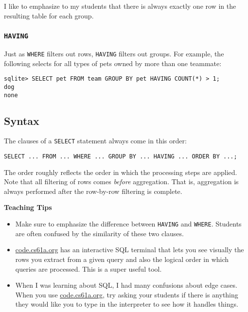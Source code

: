 \begin{meta}
I like to emphasize to my students that there is always exactly one row in the resulting table for each group. 
\end{meta}

\subsubsection{\lstinline{HAVING}}
Just as \lstinline{WHERE} filters out rows, \lstinline{HAVING} filters out groups. For example, the following selects for all types of pets owned by more than one teammate: 
\begin{lstlisting}
sqlite> SELECT pet FROM team GROUP BY pet HAVING COUNT(*) > 1; 
dog
none
\end{lstlisting}

\subsection{Syntax}
The clauses of a \lstinline{SELECT} statement always come in this order: 
\begin{lstlisting}
SELECT ... FROM ... WHERE ... GROUP BY ... HAVING ... ORDER BY ...;
\end{lstlisting}
The order roughly reflects the order in which the processing steps are applied. Note that all filtering of rows comes \textit{before} aggregation. That is, aggregation is always performed after the row-by-row filtering is complete. 

\begin{guide}
\begin{blocksection}
\textbf{Teaching Tips}
\begin{itemize}
    \item Make sure to emphasize the difference between \lstinline{HAVING} and \lstinline{WHERE}. Students are often confused by the similarity of these two clauses. 
    \item \url{code.cs61a.org} has an interactive SQL terminal that lets you see visually the rows you extract from a given query and also the logical order in which queries are processed. This is a super useful tool. 
    \item When I was learning about SQL, I had many confusions about edge cases. When you use \url{code.cs61a.org}, try asking your students if there is anything they would like you to type in the interpreter to see how it handles things. 
\end{itemize}
\end{blocksection}
\end{guide}